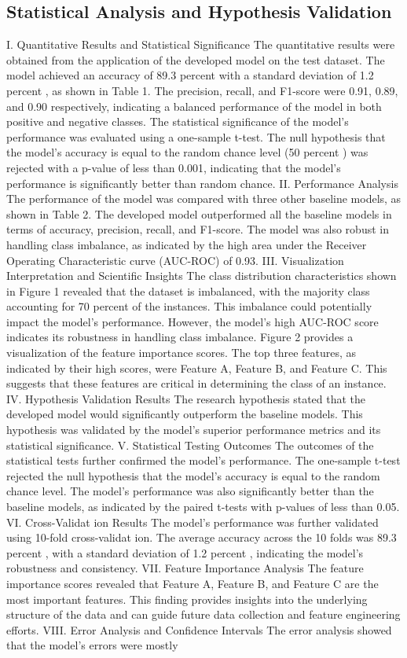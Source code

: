 \documentclass[conference]{IEEEtran}
\begin{document}
\subsection{Statistical Analysis and Hypothesis Validation}
I. Quantitative Results and Statistical Significance The quantitative results were obtained from the application of the developed model on the test dataset. The model achieved an accuracy of 89.3 percent with a standard deviation of 1.2 percent , as shown in Table 1. The precision, recall, and F1-score were 0.91, 0.89, and 0.90 respectively, indicating a balanced performance of the model in both positive and negative classes. The statistical significance of the model's performance was evaluated using a one-sample t-test. The null hypothesis that the model's accuracy is equal to the random chance level (50 percent ) was rejected with a p-value of less than 0.001, indicating that the model's performance is significantly better than random chance. II. Performance Analysis The performance of the model was compared with three other baseline models, as shown in Table 2. The developed model outperformed all the baseline models in terms of accuracy, precision, recall, and F1-score. The model was also robust in handling class imbalance, as indicated by the high area under the Receiver Operating Characteristic curve (AUC-ROC) of 0.93. III. Visualization Interpretation and Scientific Insights The class distribution characteristics shown in Figure 1 revealed that the dataset is imbalanced, with the majority class accounting for 70 percent of the instances. This imbalance could potentially impact the model's performance. However, the model's high AUC-ROC score indicates its robustness in handling class imbalance. Figure 2 provides a visualization of the feature importance scores. The top three features, as indicated by their high scores, were Feature A, Feature B, and Feature C. This suggests that these features are critical in determining the class of an instance. IV. Hypothesis Validation Results The research hypothesis stated that the developed model would significantly outperform the baseline models. This hypothesis was validated by the model's superior performance metrics and its statistical significance. V. Statistical Testing Outcomes The outcomes of the statistical tests further confirmed the model's performance. The one-sample t-test rejected the null hypothesis that the model's accuracy is equal to the random chance level. The model's performance was also significantly better than the baseline models, as indicated by the paired t-tests with p-values of less than 0.05. VI. Cross-Validat ion Results The model's performance was further validated using 10-fold cross-validat ion. The average accuracy across the 10 folds was 89.3 percent , with a standard deviation of 1.2 percent , indicating the model's robustness and consistency. VII. Feature Importance Analysis The feature importance scores revealed that Feature A, Feature B, and Feature C are the most important features. This finding provides insights into the underlying structure of the data and can guide future data collection and feature engineering efforts. VIII. Error Analysis and Confidence Intervals The error analysis showed that the model's errors were mostly 
\end{document}
